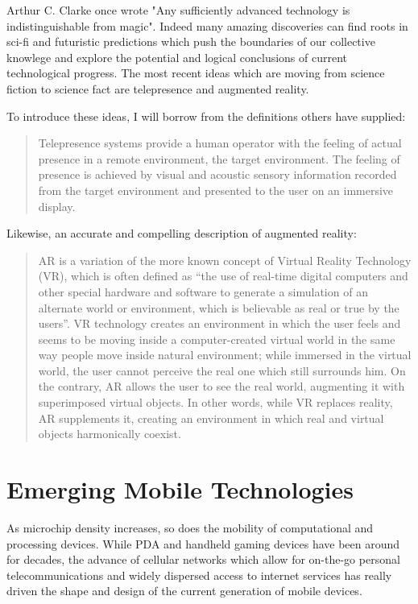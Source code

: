 \documentclass[a4paper,12pt]{report}
\begin{document}
Arthur C. Clarke once wrote "Any sufficiently advanced technology is indistinguishable from magic". Indeed many amazing discoveries can find roots in sci-fi and futuristic predictions which push the boundaries of our collective knowlege and explore the potential and logical conclusions of current technological progress. The most recent ideas which are moving from science fiction to science fact are telepresence and augmented reality. 

To introduce these ideas, I will borrow from the definitions others have supplied:
\begin{quotation}
Telepresence systems provide a human operator with the feeling of actual presence in a remote environment, the target environment. The feeling of presence is achieved by visual and acoustic sensory information recorded from the target environment and presented to the user on an immersive display.
	\begin{flushright}
		\cite{6094998}
	\end{flushright}
\end{quotation}

Likewise, an accurate and compelling description of augmented reality:

\begin{quotation}
AR is a variation of the more known concept of Virtual Reality Technology (VR), which is often defined as “the use of real-time digital computers and other special hardware and software to generate a simulation of an alternate world or environment, which is believable as real or true by the users”. VR technology creates an environment in which the user feels and seems to be moving inside a computer-created virtual world in the same way people move inside natural environment; while immersed in the virtual world, the user cannot perceive the real one which still surrounds him. On the contrary, AR allows the user to see the real world, augmenting it with superimposed virtual objects. In other words, while VR replaces reality, AR supplements it, creating an environment in which real and virtual objects harmonically coexist.
	\begin{flushright}
		\cite{5970856}
	\end{flushright}
\end{quotation}

\section{Emerging Mobile Technologies}
As microchip density increases, so does the mobility of computational and processing devices. While PDA and handheld gaming devices have been around for decades, the advance of cellular networks which allow for on-the-go personal telecommunications and widely dispersed access to internet services has really driven the shape and design of the current generation of mobile devices.
\end{document}
